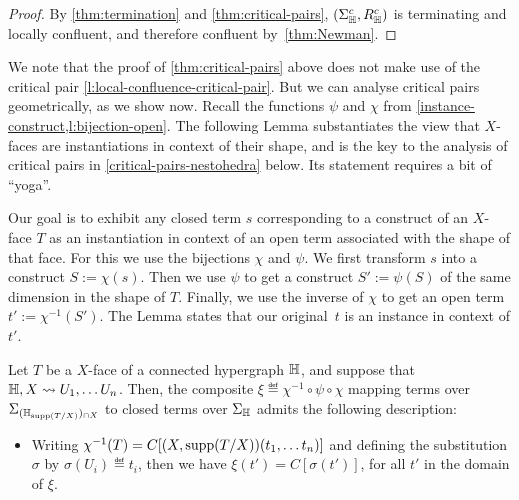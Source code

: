 \begin{proof}
  By \cref{thm:termination} and \cref{thm:critical-pairs}, $(\Sigma_{\mathbb H}^c,R_{\mathbb H}^c)$ is terminating and locally confluent, and therefore confluent by~\cref{thm:Newman}.
\end{proof}

We note that the  proof of \cref{thm:critical-pairs} above  does not make use of the critical pair \cref{l:local-confluence-critical-pair}. But we can analyse critical pairs geometrically, as we show now.
Recall the functions $\psi$ and $\chi$ from 
 \cref{instance-construct,l:bijection-open}.
The following Lemma substantiates the view that $X$-faces are instantiations in context of their shape, and is the key to the analysis of critical pairs in \cref{critical-pairs-nestohedra} below. 
Its statement requires a bit of ``yoga''.
 
Our goal is to exhibit any closed term $s$ corresponding to a construct of an $X$-face $T$ as an instantiation in context  of an open term associated with the shape of that face.
For this we use the bijections $\chi$ and $\psi$. We first transform $s$ into a construct $S:=\chi(s)$. 
Then we use $\psi$ to get a construct $S':=\psi(S)$ of the same dimension in the shape of $T$. 
Finally, we use the inverse of $\chi$ to get an open term
$t':=\chi^{-1}(S')$. 
The Lemma states that our original~$t$ is an instance in context of $t'$.

\begin{lemma} 
  \label{instance-in-context}
Let $T$ be a $X$-face of a connected hypergraph ${\mathbb H}$, and suppose that ${\mathbb H},X\leadsto U_1,\ldots U_n$. 
Then, the composite $\xi\eqdef \chi^{-1}\circ \psi\circ \chi$ mapping terms over $\Sigma_{({\mathbb H}_{\operatorname{supp}(T/X)})_{\cap X}}$ to closed terms over $\Sigma_{{\mathbb H}}$ admits the following description: 
\begin{itemize}
  \item Writing $\chi^{-1}(T)=C[(X,\operatorname{supp}(T/X))(t_1,\ldots t_n)]$ and defining the substitution $\sigma$ by $\sigma(U_i)\eqdef t_i$, then we have $\xi(t')=C[\sigma(t')]$, for all $t'$ in the domain of $\xi$.
\end{itemize}

\end{lemma}

